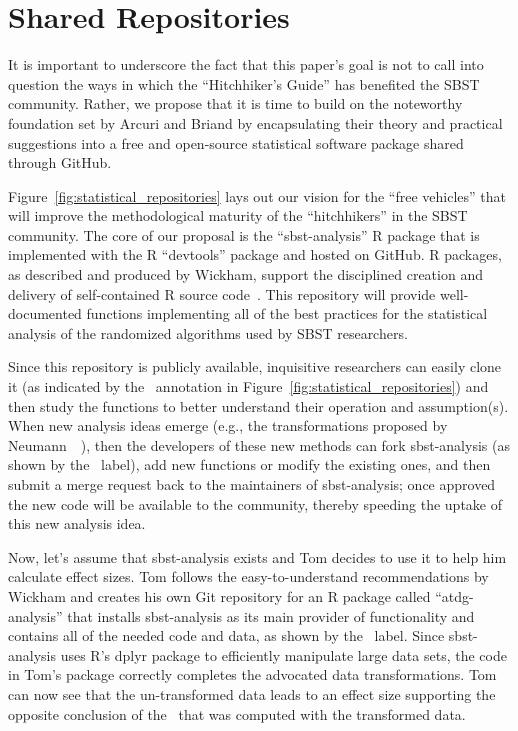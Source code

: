 
\vspace*{-.5em}

\section{Shared Repositories}
\label{sec:repositories}



It is important to underscore the fact that this paper's goal is not to call into question the ways in which the
``Hitchhiker's Guide'' has benefited the SBST community. Rather, we propose that it is time to build on the noteworthy
foundation set by Arcuri and Briand by encapsulating their theory and practical suggestions into a free and open-source
statistical software package shared through GitHub.

Figure~\ref{fig:statistical_repositories} lays out our vision for the ``free vehicles'' that will improve the
methodological maturity of the ``hitchhikers'' in the SBST community. The core of our proposal is the ``sbst-analysis''
R package that is implemented with the R ``devtools'' package and hosted on GitHub. R packages, as described and
produced by Wickham, support the disciplined creation and delivery of self-contained R source code~\cite{Wickham2015}.
This repository will provide well-documented functions implementing all of the best practices for the statistical
analysis of the randomized algorithms used by SBST researchers.

Since this repository is publicly available, inquisitive researchers can easily clone it (as indicated by the
\codecopygit~annotation in Figure~\ref{fig:statistical_repositories}) and then study the functions to better understand
their operation and assumption(s). When new analysis ideas emerge (e.g., the transformations proposed by
Neumann~\etal~\cite{Neumann2015}), then the developers of these new methods can fork sbst-analysis (as shown by the
\codeforkgit~label), add new functions or modify the existing ones, and then submit a merge request back to the
maintainers of sbst-analysis; once approved the new code will be available to the community, thereby speeding the uptake
of this new analysis idea.

Now, let's assume that sbst-analysis exists and Tom decides to use it to help him calculate effect sizes. Tom follows
the easy-to-understand recommendations by Wickham and creates his own Git repository for an R package called
``atdg-analysis'' that installs sbst-analysis as its main provider of functionality and contains all of the needed code
and data, as shown by the \codedatagit~label. Since sbst-analysis uses R's dplyr package to efficiently manipulate large
data sets, the code in Tom's package correctly completes the advocated data transformations.  Tom can now see that the
un-transformed data leads to an effect size supporting the opposite conclusion of the \atwelve~that was computed with
the transformed data.

